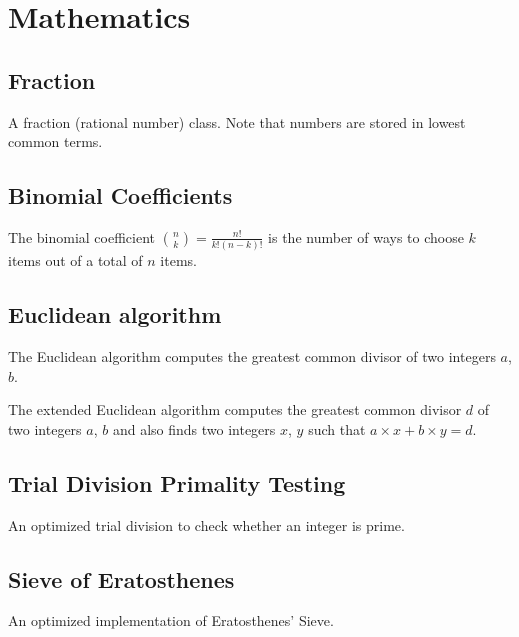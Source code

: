 \documentclass[11pt,a4paper,titlepage]{article}
\begin{document}
			

	\section{Mathematics}

		\subsection{Fraction}
			A fraction (rational number) class. Note that numbers are stored in lowest common terms.
			

		\subsection{Binomial Coefficients}
			The binomial coefficient $\binom{n}{k} = \frac{n!}{k!(n-k)!}$ is the number of ways to choose $k$ items out of a total of $n$ items.

			

			

			

		\subsection{Euclidean algorithm}
			The Euclidean algorithm computes the greatest common divisor of two integers $a$, $b$.
			

			The extended Euclidean algorithm computes the greatest common divisor $d$ of two integers $a$, $b$ and also finds two integers $x$, $y$ such that $a\times x + b\times y = d$.
			

		\subsection{Trial Division Primality Testing}
			An optimized trial division to check whether an integer is prime.
			

		\subsection{Sieve of Eratosthenes}
			An optimized implementation of Eratosthenes' Sieve.
			
\end{document}
